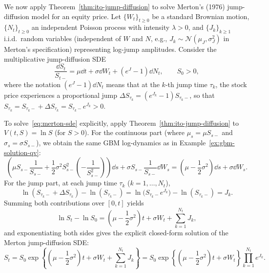 We now apply Theorem~\ref{thm:ito-jump-diffusion} to solve Merton's (1976) jump-diffusion model for an equity price. Let $\{W_t\}_{t \ge 0}$ be a standard Brownian motion, $\{N_t\}_{t \ge 0}$ an independent Poisson process with intensity $\lambda > 0$, and $\{J_k\}_{k \ge 1}$ i.i.d.\ random variables (independent of $W$ and $N$, e.g., $J_k \sim \mathcal{N}(\mu_J, \sigma_J^2)$ in Merton's specification) representing log-jump amplitudes. Consider the multiplicative jump-diffusion SDE
\begin{equation}
\label{eq:merton-sde}
\frac{\dd S_t}{S_{t-}} = \mu \dd t + \sigma \dd W_t + (e^{J} - 1)\dd N_t, \qquad S_0 > 0,
\end{equation}
where the notation $(e^J - 1)\dd N_t$ means that at the $k$-th jump time $\tau_k$, the stock price experiences a proportional jump $\Delta S_{\tau_k} = (e^{J_k} - 1) S_{\tau_k-}$, so that $S_{\tau_k} = S_{\tau_k-} + \Delta S_{\tau_k} = S_{\tau_k-} e^{J_k} > 0$.

To solve~\eqref{eq:merton-sde} explicitly, apply Theorem~\ref{thm:ito-jump-diffusion} to $V(t, S) = \ln S$ (for $S > 0$). For the continuous part (where $\mu_s = \mu S_{s-}$ and $\sigma_s = \sigma S_{s-}$), we obtain the same GBM log-dynamics as in Example~\ref{ex:gbm-solution-qv}:
\[
\left(\mu S_{s-}\frac{1}{S_{s-}} + \frac{1}{2}\sigma^2 S_{s-}^2 \left(-\frac{1}{S_{s-}^2}\right)\right)\dd s + \sigma S_{s-}\frac{1}{S_{s-}}\dd W_s = \left(\mu - \frac{1}{2}\sigma^2\right)\dd s + \sigma \dd W_s.
\]
For the jump part, at each jump time $\tau_k$ ($k = 1, \dots, N_t$),
\[
\ln(S_{\tau_k-} + \Delta S_{\tau_k}) - \ln(S_{\tau_k-}) = \ln\!\big(S_{\tau_k-} e^{J_k}\big) - \ln(S_{\tau_k-}) = J_k.
\]
Summing both contributions over $[0, t]$ yields
\[
\ln S_t - \ln S_0 = \left(\mu - \frac{1}{2}\sigma^2\right)t + \sigma W_t + \sum_{k=1}^{N_t} J_k,
\]
and exponentiating both sides gives the explicit closed-form solution of the Merton jump-diffusion SDE:
\begin{equation}
\label{eq:merton-solution}
S_t = S_0 \exp\!\left\{\left(\mu - \frac{1}{2}\sigma^2\right)t + \sigma W_t + \sum_{k=1}^{N_t} J_k\right\} = S_0 \exp\!\left\{\left(\mu - \frac{1}{2}\sigma^2\right)t + \sigma W_t\right\}\prod_{k=1}^{N_t} e^{J_k}.
\end{equation}

